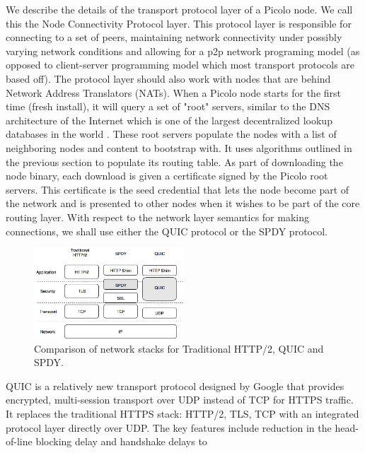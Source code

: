 We describe the details of the transport protocol layer of a \textsf{Picolo} node. We call this the Node Connectivity Protocol
layer. This protocol layer is responsible for connecting to a set of peers, maintaining network connectivity under
possibly varying network conditions and allowing for a p2p network programing model (as opposed to client-server
programming model which most transport protocols are based off).  The protocol layer should also work with nodes that
are behind Network Address Translators (NATs).
\newline\newline
When a \textsf{Picolo} node starts for the first time (fresh install), it will query a set of "root" servers, similar to the DNS
architecture of the Internet which is one of the largest decentralized lookup databases in the world \cite{icann_root}. 
These root servers populate the nodes with a list of neighboring nodes and content to bootstrap with. It uses algorithms
outlined in the previous section to populate its routing table. As part of downloading the node binary, each download is given a certificate signed by the \textsf{Picolo} root servers. This
certificate is the seed credential that lets the node become part of the network and is presented to other nodes when it
wishes to be part of the core routing layer. With respect to the network layer semantics for making connections, we shall use either the QUIC protocol or the SPDY
protocol.
\begin{figure}[t]
    \centering
    \includegraphics[width=0.5\textwidth]{fig/pic_netlayer.png}
  \caption{Comparison of network stacks for Traditional HTTP/2, QUIC and SPDY.}
\end{figure}
\newline\newline
QUIC is a relatively new transport protocol designed by Google \cite{quic_sigcomm} that provides encrypted, multi-session transport over UDP
instead of TCP for HTTPS traffic. It replaces the traditional HTTPS stack: HTTP/2, TLS, TCP with an integrated protocol
layer directly over UDP. The key features include reduction in the head-of-line blocking delay and handshake delays to
